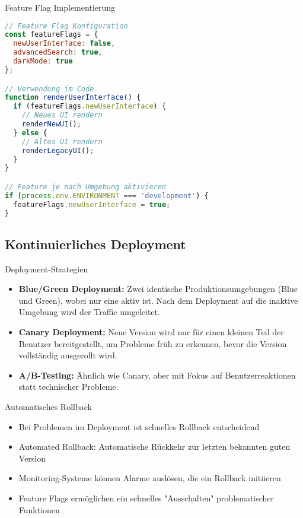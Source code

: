 \begin{examplecode}{Feature Flag Implementierung}\\
\begin{lstlisting}[language=JavaScript, style=basesmol]
// Feature Flag Konfiguration
const featureFlags = {
  newUserInterface: false,
  advancedSearch: true,
  darkMode: true
};

// Verwendung im Code
function renderUserInterface() {
  if (featureFlags.newUserInterface) {
    // Neues UI rendern
    renderNewUI();
  } else {
    // Altes UI rendern
    renderLegacyUI();
  }
}

// Feature je nach Umgebung aktivieren
if (process.env.ENVIRONMENT === 'development') {
  featureFlags.newUserInterface = true;
}
\end{lstlisting}
\end{examplecode}

\subsection{Kontinuierliches Deployment}

\begin{concept}{Deployment-Strategien}\\
    \begin{itemize}
        \item \textbf{Blue/Green Deployment:} Zwei identische Produktionsumgebungen (Blue und Green), wobei nur eine aktiv ist. Nach dem Deployment auf die inaktive Umgebung wird der Traffic umgeleitet.
        
        \item \textbf{Canary Deployment:} Neue Version wird nur für einen kleinen Teil der Benutzer bereitgestellt, um Probleme früh zu erkennen, bevor die Version vollständig ausgerollt wird.
        
        \item \textbf{A/B-Testing:} Ähnlich wie Canary, aber mit Fokus auf Benutzerreaktionen statt technischer Probleme.
    \end{itemize}
\end{concept}

\begin{concept}{Automatisches Rollback}\\
    \begin{itemize}
        \item Bei Problemen im Deployment ist schnelles Rollback entscheidend
        \item Automated Rollback: Automatische Rückkehr zur letzten bekannten guten Version
        \item Monitoring-Systeme können Alarme auslösen, die ein Rollback initiieren
        \item Feature Flags ermöglichen ein schnelles "Ausschalten" problematischer Funktionen
    \end{itemize}
\end{concept}

